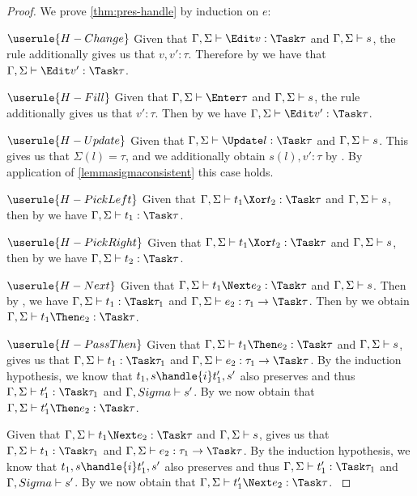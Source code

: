 \begin{proof}
  We prove \cref{thm:pres-handle} by induction on $e$:

  \case
    {$\userule{H-Change}$}
    {Given that $\Gamma,\Sigma\infers\Edit v:\Task\tau$ and $\Gamma,\Sigma\vdash s$, the  rule additionally gives us that $v,v':\tau$. Therefore by  we have that $\Gamma,\Sigma\infers\Edit v':\Task\tau$.}

  \case
    {$\userule{H-Fill}$}
    {Given that $\Gamma,\Sigma\infers\Enter\tau$ and $\Gamma,\Sigma\vdash s$, the  rule additionally gives us that $v':\tau$.
    Then by  we have $\Gamma,\Sigma\infers \Edit v':\Task\tau$.}

  \case
    {$\userule{H-Update}$}
    {Given that $\Gamma,\Sigma\infers\Update l:\Task\tau$ and $\Gamma,\Sigma\vdash s$.
    This gives us that $\Sigma(l)=\tau$, and we additionally obtain $s(l),v':\tau$ by .
    By application of \cref{lemmasigmaconsistent} this case holds.}

  \case
    {$\userule{H-PickLeft}$}
    {Given that $\Gamma,\Sigma\infers t_1\Xor t_2:\Task\tau$ and $\Gamma,\Sigma\vdash s$,
    then by  we have $\Gamma,\Sigma\infers t_1:\Task \tau$.}

  \case
    {$\userule{H-PickRight}$}
    {Given that $\Gamma,\Sigma\infers t_1\Xor t_2:\Task\tau$ and $\Gamma,\Sigma\vdash s$,
    then by  we have $\Gamma,\Sigma\infers t_2:\Task \tau$.}

  \case
    {$\userule{H-Next}$}
    {Given that $\Gamma,\Sigma\infers t_1\Next e_2 :\Task\tau$ and $\Gamma,\Sigma\vdash s$.
    Then by , we have $\Gamma,\Sigma\infers t_1:\Task\tau_1$ and $\Gamma,\Sigma\infers e_2:\tau_1\to\Task\tau$.
    Then by  we obtain $\Gamma,\Sigma\infers t_1\Then e_2:\Task\tau$.}

  \case
    {$\userule{H-PassThen}$}
    {Given that $\Gamma,\Sigma\infers t_1\Then e_2:\Task\tau$ and $\Gamma,\Sigma\vdash s$,
     gives us that $\Gamma,\Sigma\infers t_1:\Task\tau_1$ and $\Gamma,\Sigma\infers e_2:\tau_1\to\Task\tau$.
    By the induction hypothesis, we know that $t_1,s\handle{i}t_1',s'$ also preserves and thus $\Gamma,\Sigma\infers t_1':\Task\tau_1$ and $\Gamma,Sigma\vdash s'$.
    By  we now obtain that $\Gamma,\Sigma\infers t_1'\Then e_2:\Task\tau$.}

     {Given that $\Gamma,\Sigma\infers t_1\Next e_2:\Task\tau$ and $\Gamma,\Sigma\vdash s$,  gives us that $\Gamma,\Sigma\infers t_1:\Task\tau_1$ and $\Gamma,\Sigma\infers e_2:\tau_1\to\Task\tau$.
     By the induction hypothesis, we know that $t_1,s\handle{i}t_1',s'$ also preserves and thus $\Gamma,\Sigma\infers t_1':\Task\tau_1$ and $\Gamma,Sigma\vdash s'$.
     By  we now obtain that $\Gamma,\Sigma\infers t_1'\Next e_2:\Task\tau$. }


\end{proof}
